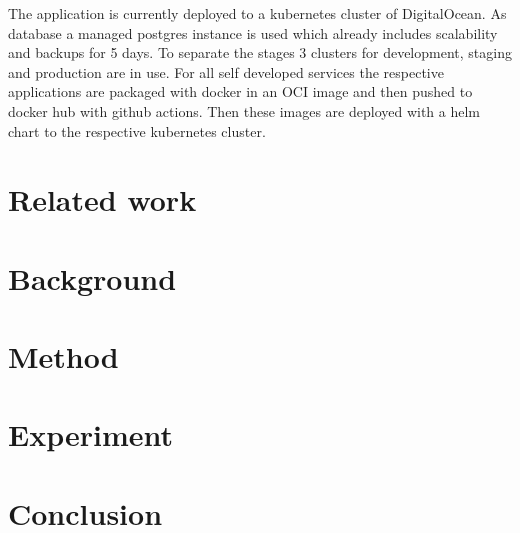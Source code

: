 \documentclass[conference]{IEEEtran}
\begin{document}
The application is currently deployed to a kubernetes cluster of DigitalOcean.
As database a managed postgres instance is used which already includes scalability and backups for 5 days.
To separate the stages 3 clusters for development, staging and production are in use.
For all self developed services the respective applications are packaged with docker in an OCI image and then
pushed to docker hub with github actions\cite{ecamp3-reusable-build-and-push}.
Then these images are deployed with a helm chart to the respective kubernetes cluster\cite{ecamp3-reusable-dev-deployment, ecamp3-deployment-stage-prod}.

\section{Related work}

\section{Background}

\section{Method}

\section{Experiment}

\section{Conclusion}




\date{\today}



\newpage
%
\end{document}
